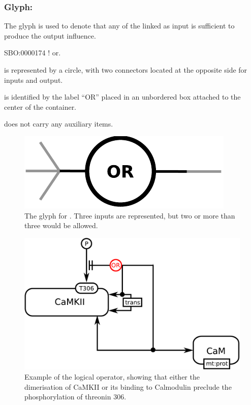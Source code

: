 \color{blue}
\subsubsection{Glyph: }\label{sec:or}

The glyph  is used to denote that any of the  linked as input is sufficient to produce the output influence.

\begin{glyphDescription}

 \glyphSboTerm SBO:0000174 ! or.

 \glyphContainer {} is represented by a circle, with two connectors located at the opposite side for inputs and output.

  \glyphLabel {} is identified by the label ``OR'' placed in an unbordered box attached to the center of the container. 

  \glyphAux {} does not carry any auxiliary items.

\end{glyphDescription}

\begin{figure}[H]
  \centering
  \includegraphics[scale = 0.5]{images/or}
  \caption{The \ER glyph for . Three inputs are represented, but two or more than three would be allowed.}
  \label{fig:or}
\end{figure}


\begin{figure}[H]
  \centering
  \includegraphics[scale = 0.5]{examples/ex-or}
  \caption{Example of the  logical operator, showing that either the dimerisation of CaMKII or its binding to Calmodulin preclude the phosphorylation of threonin 306.}
  \label{fig:ex-or}
\end{figure}